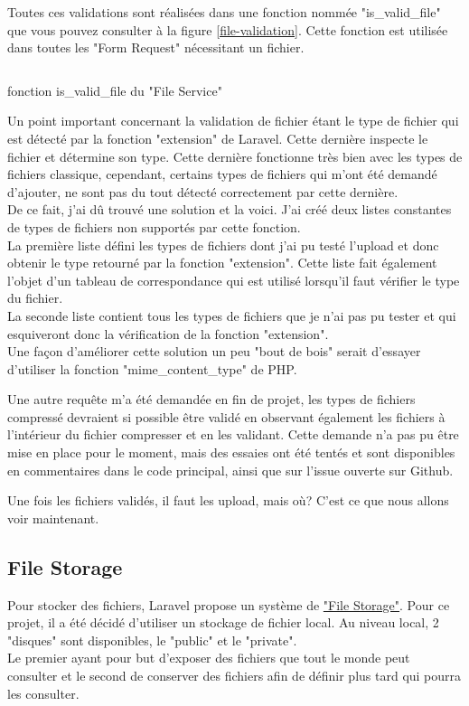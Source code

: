 \documentclass[
    iai, %
    il, %
]{heig-tb}
\begin{document}
Toutes ces validations sont réalisées dans une fonction nommée "is_valid_file" que vous pouvez consulter à la figure \ref{file-validation}. Cette fonction est utilisée dans toutes les "Form Request" nécessitant un fichier.

\begin{listing}[h]
    \inputminted{php}{assets/code/FileValidation.php}
    \caption{fonction is_valid_file du "File Service" \label{file-validation}}
\end{listing}

Un point important concernant la validation de fichier étant le type de fichier qui est détecté par la fonction "extension" de Laravel. Cette dernière inspecte le fichier et détermine son type. Cette dernière fonctionne très bien avec les types de fichiers classique, cependant, certains types de fichiers qui m'ont été demandé d'ajouter, ne sont pas du tout détecté correctement par cette dernière. \\
De ce fait, j'ai dû trouvé une solution et la voici. J'ai créé deux listes constantes de types de fichiers non supportés par cette fonction. \\
La première liste défini les types de fichiers dont j'ai pu testé l'upload et donc obtenir le type retourné par la fonction "extension". Cette liste fait également l'objet d'un tableau de correspondance qui est utilisé lorsqu'il faut vérifier le type du fichier. \\
La seconde liste contient tous les types de fichiers que je n'ai pas pu tester et qui esquiveront donc la vérification de la fonction "extension". \\
Une façon d'améliorer cette solution un peu "bout de bois" serait d'essayer d'utiliser la fonction "mime_content_type" de PHP.

Une autre requête m'a été demandée en fin de projet, les types de fichiers compressé devraient si possible être validé en observant également les fichiers à l'intérieur du fichier compresser et en les validant. Cette demande n'a pas pu être mise en place pour le moment, mais des essaies ont été tentés et sont disponibles en commentaires dans le code principal, ainsi que sur l'issue ouverte sur Github.

Une fois les fichiers validés, il faut les upload, mais où? C'est ce que nous allons voir maintenant.

\subsection{File Storage}
Pour stocker des fichiers, Laravel propose un système de \href{https://laravel.com/docs/9.x/filesystem}{"File Storage"}. Pour ce projet, il a été décidé d'utiliser un stockage de fichier local. Au niveau local, 2 "disques" sont disponibles, le "public" et le "private". \\
Le premier ayant pour but d'exposer des fichiers que tout le monde peut consulter et le second de conserver des fichiers afin de définir plus tard qui pourra les consulter. \\
\end{document}
